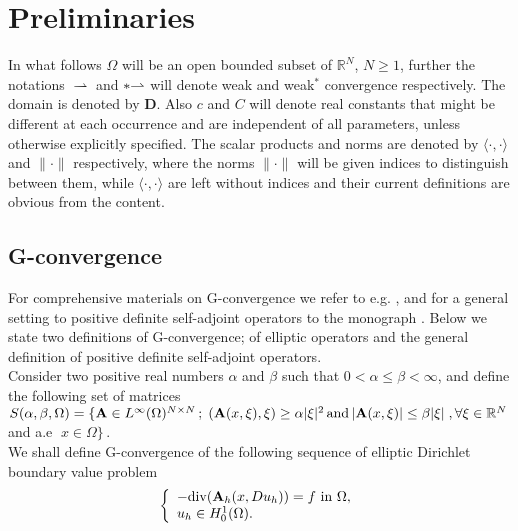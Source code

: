 \documentclass[11pt, epsf]{amsart}
\begin{document}
\section{Preliminaries}
In what follows $\Omega$ will be an open bounded subset of $\mathbb{R}^N$, $N\geq1$, further the notations $\rightharpoonup$ and $\ast\negthickspace\rightharpoonup$ will denote weak and weak$^\ast$ convergence respectively. The domain is denoted by $\mathbf{D}$. Also $c$ and $C$ will denote real constants that might be different at each occurrence and are independent of all parameters, unless otherwise explicitly specified. The scalar products and norms are denoted by $\langle\cdot,\cdot\rangle$ and $\|\cdot\|$ respectively, where the norms $\|\cdot\|$ will be given indices to distinguish between them, while $\langle\cdot,\cdot\rangle$ are left without indices and their current definitions are obvious from the content.
\subsection{G-convergence}

For comprehensive materials on G-convergence we refer to e.g. \cite{DEF,OLS,SIL}, and for a general setting to positive definite self-adjoint operators to the monograph \cite{DAL}. Below we state two definitions of G-convergence; of elliptic operators and the general definition of positive definite self-adjoint operators.\\

Consider two positive real numbers $\alpha$ and $\beta$ such that $0<\alpha\leq\beta<\infty$, and define the following set of matrices\\
$
S(\alpha,\beta,\Omega)=\{\text{\textbf{A}}\in L^\infty(\Omega)^{N\times N}\,;\; (\text{\textbf{A}}(x,\xi),\xi)\geq\alpha |\xi|^2\,\text{and}\, |\text{\textbf{A}}(x,\xi)|\leq\beta|\xi|\; , \forall\xi\in\mathbb{R}^N$ and a.e $\;x\in\Omega\}\,.$\\
We shall define G-convergence of the following sequence of elliptic Dirichlet boundary value problem
\begin{equation}\label{16}
\left\{ \begin{array}{l}
-{\rm div}(\text{\textbf{A}}_h(x,Du_h)) = f \mbox{ in }{\Omega},\\
u_h\in H_0^1(\Omega).
\end{array} \right.
\end{equation}
\end{document}
